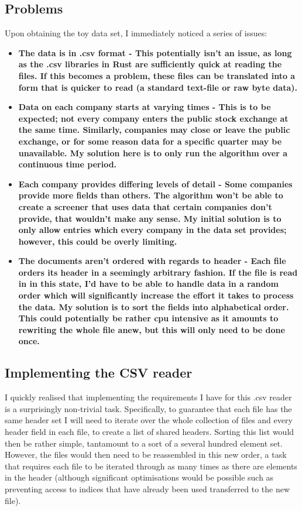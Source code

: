 \subsection{Problems}
Upon obtaining the toy data set, I immediately noticed a series of issues:
\begin{itemize}
    \item \bf The data is in .csv format \rm - This potentially isn't an issue, as long as the .csv libraries in Rust are sufficiently quick at reading the files. If this becomes a problem, these files can be translated into a form that is quicker to read (a standard text-file or raw byte data).
    \item \bf Data on each company starts at varying times \rm - This is to be expected; not every company enters the public stock exchange at the same time. Similarly, companies may close or leave the public exchange, or for some reason data for a specific quarter may be unavailable. My solution here is to only run the algorithm over a continuous time period.
    \item \bf Each company provides differing levels of detail \rm - Some companies provide more fields than others. The algorithm won't be able to create a screener that uses data that certain companies don't provide, that wouldn't make any sense. My initial solution is to only allow entries which every company in the data set provides; however, this could be overly limiting.
    \item \bf The documents aren't ordered with regards to header \rm - Each file orders its header in a seemingly arbitrary fashion. If the file is read in in this state, I'd have to be able to handle data in a random order which will significantly increase the effort it takes to process the data. My solution is to sort the fields into alphabetical order. This could potentially be rather cpu intensive as it amounts to rewriting the whole file anew, but this will only need to be done once.
\end{itemize}

\subsection{Implementing the CSV reader} \label{DataCSVRead}
I quickly realised that implementing the requirements I have for this .csv reader is a surprisingly non-trivial task. Specifically, to guarantee that each file has the same header set I will need to iterate over the whole collection of files and every header field in each file, to create a list of shared headers. Sorting this list would then be rather simple, tantamount to a sort of a several hundred element set. However, the files would then need to be reassembled in this new order, a task that requires each file to be iterated through as many times as there are elements in the header (although significant optimisations would be possible such as preventing access to indices that have already been used transferred to the new file). \newline

